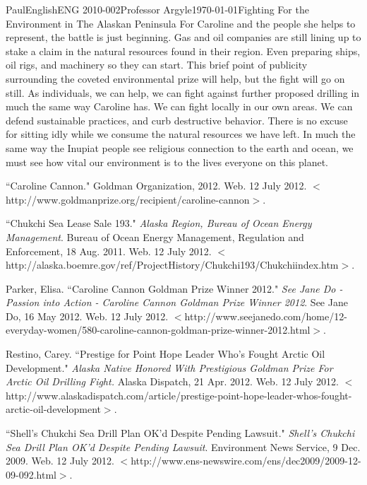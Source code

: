 \documentclass[12pt,letterpaper]{article}
\begin{document}
\begin{mla}{Paul}{English}{ENG 2010-002}{Professor Argyle}{\today}{Fighting For the Environment in The Alaskan Peninsula}
For Caroline and the people she helps to represent, the battle is just beginning. Gas and oil companies are still lining up to stake a claim in the natural resources found in their region. Even preparing ships, oil rigs, and machinery so they can start. This brief point of publicity surrounding the coveted environmental prize will help, but the fight will go on still. As individuals, we can help, we can fight against further proposed drilling in much the same way Caroline has. We can fight locally in our own areas. We can defend sustainable practices, and curb destructive behavior. There is no excuse for sitting idly while we consume the natural resources we have left. In much the same way the Inupiat people see religious connection to the earth and ocean, we must see how vital our environment is to the lives everyone on this planet.

\begin{workscited}

\bibent
``Caroline Cannon." Goldman Organization, 2012. Web. 12 July 2012. $<$http://www.goldmanprize.org/recipient/caroline-cannon$>$.

\bibent
``Chukchi Sea Lease Sale 193." \textit{Alaska Region, Bureau of Ocean Energy Management}. Bureau of Ocean Energy Management, Regulation and Enforcement, 18 Aug. 2011. Web. 12 July 2012. $<$http://alaska.boemre.gov/ref/ProjectHistory/Chukchi193/Chukchiindex.htm$>$.


\bibent
Parker, Elisa. ``Caroline Cannon Goldman Prize Winner 2012." \textit{See Jane Do - Passion into Action - Caroline Cannon Goldman Prize Winner 2012}. See Jane Do, 16 May 2012. Web. 12 July 2012. $<$http://www.seejanedo.com/home/12-everyday-women/580-caroline-cannon-goldman-prize-winner-2012.html$>$.

\bibent 
Restino, Carey. ``Prestige for Point Hope Leader Who's Fought Arctic Oil Development." \textit{Alaska Native Honored With Prestigious Goldman Prize For Arctic Oil Drilling Fight.} Alaska Dispatch, 21 Apr. 2012. Web. 12 July 2012. $<$http://www.alaskadispatch.com/article/prestige-point-hope-leader-whos-fought-arctic-oil-development$>$.

\bibent
``Shell's Chukchi Sea Drill Plan OK'd Despite Pending Lawsuit." \textit{Shell's Chukchi Sea Drill Plan OK'd Despite Pending Lawsuit}. Environment News Service, 9 Dec. 2009. Web. 12 July 2012. $<$http://www.ens-newswire.com/ens/dec2009/2009-12-09-092.html$>$.


\end{workscited}
\end{mla}
\end{document}
